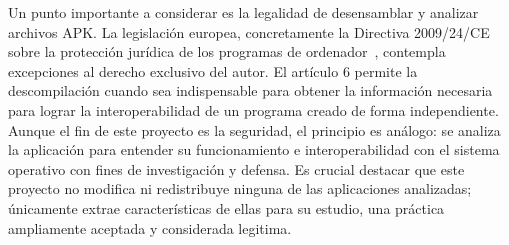 Un punto importante a considerar es la legalidad de desensamblar y analizar archivos APK. La legislación europea, concretamente la Directiva 2009/24/CE sobre la protección jurídica de los programas de ordenador~\cite{europea2009directiva}, contempla excepciones al derecho exclusivo del autor. El artículo 6 permite la descompilación cuando sea indispensable para obtener la información necesaria para lograr la interoperabilidad de un programa creado de forma independiente. Aunque el fin de este proyecto es la seguridad, el principio es análogo: se analiza la aplicación para entender su funcionamiento e interoperabilidad con el sistema operativo con fines de investigación y defensa. Es crucial destacar que este proyecto no modifica ni redistribuye ninguna de las aplicaciones analizadas; únicamente extrae características de ellas para su estudio, una práctica ampliamente aceptada y considerada legitima.
